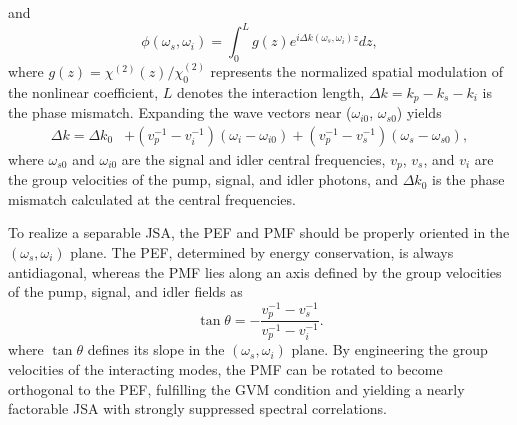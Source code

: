 \documentclass[aps, amsmath, amssymb,reprint,superscriptaddress]{revtex4-2}
\begin{document}
and \begin{equation}
\phi(\omega_s,\omega_i)=\int_0^{L} g(z)e^{i\Delta k(\omega_s,\omega_i)z}dz,
\end{equation}
where $g(z)=\chi^{(2)}(z)/\chi_0^{(2)}$ represents the normalized spatial modulation of the nonlinear coefficient, $L$ denotes the interaction length, $\Delta k=k_p-k_s-k_i$ is the phase mismatch. Expanding the wave vectors near ($\omega_{i0}$, $\omega_{s0}$) yields
\begin{equation}
\begin{aligned}
\Delta k = \Delta k_0
&+ (v_p^{-1}-v_i^{-1})(\omega_i-\omega_{i0})+ (v_p^{-1}-v_s^{-1})(\omega_s-\omega_{s0}),
\end{aligned}
\end{equation}
where $\omega_{s0}$ and $\omega_{i0}$ are the signal and idler central frequencies,
$v_p$, $v_s$, and $v_i$ are the group velocities of the pump, signal, and idler photons, and
$\Delta k_0$ is the phase mismatch calculated at the central frequencies.














To realize a separable JSA, the PEF and PMF should be properly oriented in the $(\omega_s, \omega_i)$ plane. The PEF, determined by energy conservation, is always antidiagonal, whereas the PMF lies along an axis defined by the group velocities of the pump, signal, and idler fields as
\begin{equation}
\tan\theta = -\frac{v_p^{-1} - v_s^{-1}}{v_p^{-1} - v_i^{-1}}.
\label{eq:GVM}
\end{equation}
where $\tan\theta$ defines its slope in the $(\omega_s, \omega_i)$ plane. By engineering the group velocities of the interacting modes\cite{mosley2008conditional, 2006generation}, the PMF can be rotated to become orthogonal to the PEF, fulfilling the GVM condition and yielding a nearly factorable JSA with strongly suppressed spectral correlations.
\end{document}
